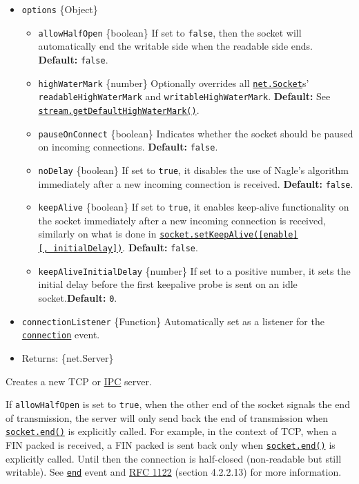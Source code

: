 \begin{itemize}
\item
  \texttt{options} \{Object\}

  \begin{itemize}
  \tightlist
  \item
    \texttt{allowHalfOpen} \{boolean\} If set to \texttt{false}, then
    the socket will automatically end the writable side when the
    readable side ends. \textbf{Default:} \texttt{false}.
  \item
    \texttt{highWaterMark} \{number\} Optionally overrides all
    \hyperref[class-netsocket]{\texttt{net.Socket}}s'
    \texttt{readableHighWaterMark} and \texttt{writableHighWaterMark}.
    \textbf{Default:} See
    \href{stream.md\#streamgetdefaulthighwatermarkobjectmode}{\texttt{stream.getDefaultHighWaterMark()}}.
  \item
    \texttt{pauseOnConnect} \{boolean\} Indicates whether the socket
    should be paused on incoming connections. \textbf{Default:}
    \texttt{false}.
  \item
    \texttt{noDelay} \{boolean\} If set to \texttt{true}, it disables
    the use of Nagle's algorithm immediately after a new incoming
    connection is received. \textbf{Default:} \texttt{false}.
  \item
    \texttt{keepAlive} \{boolean\} If set to \texttt{true}, it enables
    keep-alive functionality on the socket immediately after a new
    incoming connection is received, similarly on what is done in
    \hyperref[socketsetkeepaliveenable-initialdelay]{\texttt{socket.setKeepAlive({[}enable{]}{[},\ initialDelay{]})}}.
    \textbf{Default:} \texttt{false}.
  \item
    \texttt{keepAliveInitialDelay} \{number\} If set to a positive
    number, it sets the initial delay before the first keepalive probe
    is sent on an idle socket.\textbf{Default:} \texttt{0}.
  \end{itemize}
\item
  \texttt{connectionListener} \{Function\} Automatically set as a
  listener for the
  \hyperref[event-connection]{\texttt{\textquotesingle{}connection\textquotesingle{}}}
  event.
\item
  Returns: \{net.Server\}
\end{itemize}

Creates a new TCP or \hyperref[ipc-support]{IPC} server.

If \texttt{allowHalfOpen} is set to \texttt{true}, when the other end of
the socket signals the end of transmission, the server will only send
back the end of transmission when
\hyperref[socketenddata-encoding-callback]{\texttt{socket.end()}} is
explicitly called. For example, in the context of TCP, when a FIN packed
is received, a FIN packed is sent back only when
\hyperref[socketenddata-encoding-callback]{\texttt{socket.end()}} is
explicitly called. Until then the connection is half-closed
(non-readable but still writable). See
\hyperref[event-end]{\texttt{\textquotesingle{}end\textquotesingle{}}}
event and \href{https://tools.ietf.org/html/rfc1122}{RFC 1122} (section
4.2.2.13) for more information.

